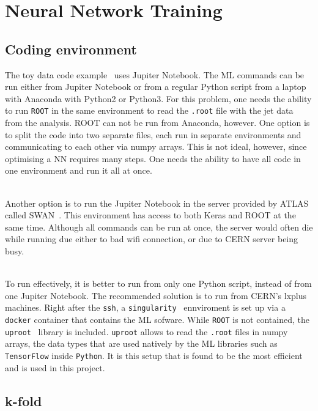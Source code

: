 \section{Neural Network Training}
\label{sec:NeuralNetworks}

\subsection{Coding environment}
\label{sec:CodingEnvironment}

The toy data code example~\cite{AGlazovCode} uses Jupiter Notebook. The ML commands can be run either from Jupiter Notebook or from a regular Python script from a laptop with Anaconda with Python2 or Python3. For this problem, one needs the ability to run \texttt{ROOT} in the same environment to read the \texttt{.root} file with the jet data from the analysis. ROOT can not be run from Anaconda, however. One option is to split the code into two separate files, each run in separate environments and communicating to each other via numpy arrays. This is not ideal, however, since optimising a NN requires many steps. One needs the ability to have all code in one environment and run it all at once.

\ \\Another option is to run the Jupiter Notebook in the server provided by ATLAS called SWAN~\cite{SWAN}. This environment has access to both Keras and ROOT at the same time. Although all commands can be run at once, the server would often die while running due either to bad wifi connection, or due to CERN server being busy.

\ \\To run effectively, it is better to run from only one Python script, instead of from one Jupiter Notebook. The recommended solution is to run from CERN's lxplus machines. Right after the \texttt{ssh}, a \texttt{singularity}~\cite{singularity} ennviroment is set up via a \texttt{docker} container that contains the ML sofware. While \texttt{ROOT} is not contained, the \texttt{uproot}~\cite{uproot} library is included. \texttt{uproot} allows to read the \texttt{.root} files in numpy arrays, the data types that are used natively by the ML libraries such as \texttt{TensorFlow} inside \texttt{Python}. It is this setup that is found to be the most efficient and is used in this project.

\subsection{k-fold}
\label{sec:k-fold}

